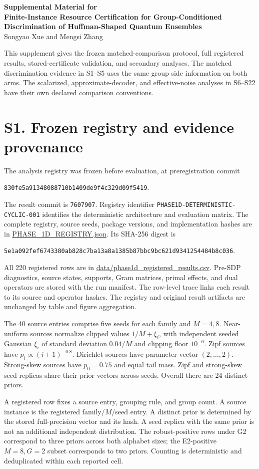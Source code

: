 \documentclass[10pt]{article}
\newcommand{\suppsection}[1]{\section*{#1}}
\begin{document}
\begin{center}
{\Large\bfseries Supplemental Material for}\\[0.6em]
{\large\bfseries Finite-Instance Resource Certification for Group-Conditioned Discrimination of Huffman-Shaped Quantum Ensembles}\\[1em]
Songyao Xue and Mengsi Zhang
\end{center}
This supplement gives the frozen matched-comparison protocol, full registered results, stored-certificate validation, and secondary analyses. The matched discrimination evidence in S1--S5 uses the same group side information on both arms. The scalarized, approximate-decoder, and effective-noise analyses in S6--S22 have their own declared comparison conventions.

\suppsection{S1. Frozen registry and evidence provenance}
The analysis registry was frozen before evaluation, at preregistration commit
\begin{center}\small\texttt{830fe5a91348088710b1409de9f4c329d09f5419}.\end{center}
The result commit is \texttt{7607907}. Registry identifier \texttt{PHASE1D-DETERMINISTIC-CYCLIC-001} identifies the deterministic architecture and evaluation matrix. The complete registry, source seeds, package versions, and implementation hashes are in \url{PHASE_1D_REGISTRY.json}. Its SHA-256 digest is
\begin{center}\footnotesize\texttt{5e1a092fef6743380ab828c7ba13a8a1385b87bbc9bc621d9341254484b8c036}.\end{center}
All 220 registered rows are in \url{data/phase1d_registered_results.csv}. Pre-SDP diagnostics, source states, supports, Gram matrices, primal effects, and dual operators are stored with the run manifest. The row-level trace links each result to its source and operator hashes. The registry and original result artifacts are unchanged by table and figure aggregation.

The 40 source entries comprise five seeds for each family and $M=4,8$. Near-uniform sources normalize clipped values $1/M+\xi_i$, with independent seeded Gaussian $\xi_i$ of standard deviation $0.04/M$ and clipping floor $10^{-6}$. Zipf sources have $p_i\propto(i+1)^{-0.8}$. Dirichlet sources have parameter vector $(2,\ldots,2)$. Strong-skew sources have $p_0=0.75$ and equal tail mass. Zipf and strong-skew seed replicas share their prior vectors across seeds. Overall there are 24 distinct priors.

A registered row fixes a source entry, grouping rule, and group count. A source instance is the registered family/$M$/seed entry. A distinct prior is determined by the stored full-precision vector and its hash. A seed replica with the same prior is not an additional independent distribution. The robust-positive rows under G2 correspond to three priors across both alphabet sizes; the E2-positive $M=8,G=2$ subset corresponds to two priors. Counting is deterministic and deduplicated within each reported cell.
\end{document}
